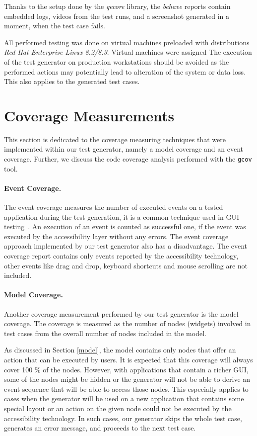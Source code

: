 Thanks to the setup done by the \textit{qecore} library, the \textit{behave} reports contain embedded logs, videos from the test runs, and a screenshot generated in a moment, when the test case fails.

All performed testing was done on virtual machines preloaded with distributions \textit{Red Hat Enterprise Linux 8.2/8.3}. Virtual machines were assigned  The execution of the test generator on production workstations should be avoided as the performed actions may potentially lead to alteration of the system or data loss.  This also applies to the generated test cases. 


\section{Coverage Measurements}\label{coverage}
This section is dedicated to the coverage measuring techniques that were implemented within our test generator, namely a model coverage and an event coverage. Further, we discuss the code coverage analysis performed with the \verb|gcov| tool.

\paragraph{Event Coverage.} The event coverage measures the number of executed events on a tested application during the test generation, it is a common technique used in GUI testing~\cite{NguyenBao2014Gait}. An execution of an event is counted as successful one, if the event was executed by the accessibility layer without any errors. The event coverage approach implemented by our test generator also has a disadvantage. The event coverage report contains only events reported by the accessibility technology, other events like drag and drop, keyboard shortcuts and mouse scrolling are not included.

\paragraph{Model Coverage.} Another coverage measurement performed by our test generator is the model coverage. The coverage is measured as the number of nodes (widgets) involved in test cases from the overall number of nodes included in the model.

As discussed in Section \ref{model}, the model contains only nodes that offer an action that can be executed by users. It is expected that this coverage will always cover 100 \% of the nodes. However, with applications that contain a richer GUI, some of the nodes might be hidden or the generator will not be able to derive an event sequence that will be able to access those nodes. This especially applies to cases when the generator will be used on a new application that contains some special layout or an action on the given node could not be executed by the accessibility technology. In such cases, our generator skips the whole test case, generates an error message, and proceeds to the next test case. 

